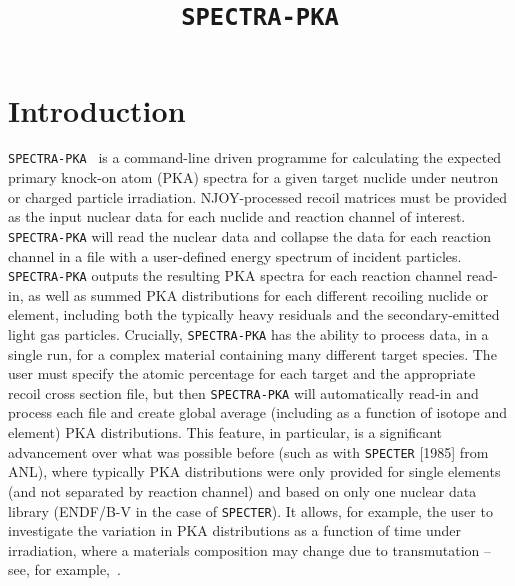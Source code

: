 \documentclass[a4paper]{article}
\begin{document}
\title{\texttt{SPECTRA-PKA}}

\maketitle
\section{Introduction}
\texttt{SPECTRA-PKA}~\cite{gilbertmariansublet2015} is a command-line driven programme for calculating the expected primary knock-on atom (PKA) spectra for a given target nuclide under neutron or charged particle irradiation. NJOY-processed recoil matrices must be provided as the input nuclear data for each nuclide and reaction channel of interest. \texttt{SPECTRA-PKA} will read the nuclear data and collapse the data for each reaction channel in a file with a user-defined energy spectrum of incident particles. \texttt{SPECTRA-PKA} outputs the resulting PKA spectra for each reaction channel read-in, as well as summed PKA distributions for each different recoiling nuclide or element, including both the typically heavy residuals and the secondary-emitted light gas particles. Crucially, \texttt{SPECTRA-PKA} has the ability to process data, in a single run, for a complex material containing many different target species. The user must specify the atomic percentage for each target and the appropriate recoil cross section file, but then \texttt{SPECTRA-PKA} will automatically read-in and process each file and create global average (including as a function of isotope and element) PKA distributions. This feature, in particular, is a significant advancement over what was possible before (such as with \texttt{SPECTER} [1985] from ANL), where typically PKA distributions were only provided for single elements (and not separated by reaction channel) and based on only one nuclear data library (ENDF/B-V in the case of \texttt{SPECTER}). It allows, for example, the user to investigate the variation in PKA distributions as a function of time under irradiation, where a materials composition may change due to transmutation -- see, for example,~\cite{gilbertsubletNME2016}.
\end{document}
